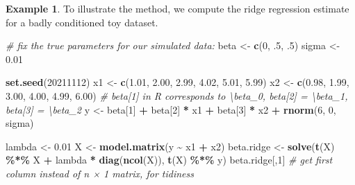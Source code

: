 \documentclass[
  a4paper,
]{article}
\newenvironment{Shaded}{\begin{snugshade}}{\end{snugshade}}
\newcommand{\CommentTok}[1]{\textcolor[rgb]{0.56,0.35,0.01}{\textit{#1}}}
\newcommand{\DecValTok}[1]{\textcolor[rgb]{0.00,0.00,0.81}{#1}}
\newcommand{\FloatTok}[1]{\textcolor[rgb]{0.00,0.00,0.81}{#1}}
\newcommand{\FunctionTok}[1]{\textcolor[rgb]{0.13,0.29,0.53}{\textbf{#1}}}
\newcommand{\NormalTok}[1]{#1}
\newcommand{\OtherTok}[1]{\textcolor[rgb]{0.56,0.35,0.01}{#1}}
\newcommand{\SpecialCharTok}[1]{\textcolor[rgb]{0.81,0.36,0.00}{\textbf{#1}}}
\theoremstyle{definition}
\theoremstyle{definition}
\newtheorem{example}{Example}[section]
\theoremstyle{definition}
\theoremstyle{definition}
\theoremstyle{remark}
\begin{document}
\begin{example}
\protect\hypertarget{exm:knorkel}{}\label{exm:knorkel}To illustrate the method, we compute the ridge regression estimate for
a badly conditioned toy dataset.

\begin{Shaded}
\begin{Highlighting}[]
\CommentTok{\# fix the true parameters for our simulated data:}
\NormalTok{beta }\OtherTok{\textless{}{-}} \FunctionTok{c}\NormalTok{(}\DecValTok{0}\NormalTok{, .}\DecValTok{5}\NormalTok{, .}\DecValTok{5}\NormalTok{)}
\NormalTok{sigma }\OtherTok{\textless{}{-}} \FloatTok{0.01}

\FunctionTok{set.seed}\NormalTok{(}\DecValTok{20211112}\NormalTok{)}
\NormalTok{x1 }\OtherTok{\textless{}{-}} \FunctionTok{c}\NormalTok{(}\FloatTok{1.01}\NormalTok{, }\FloatTok{2.00}\NormalTok{, }\FloatTok{2.99}\NormalTok{, }\FloatTok{4.02}\NormalTok{, }\FloatTok{5.01}\NormalTok{, }\FloatTok{5.99}\NormalTok{)}
\NormalTok{x2 }\OtherTok{\textless{}{-}} \FunctionTok{c}\NormalTok{(}\FloatTok{0.98}\NormalTok{, }\FloatTok{1.99}\NormalTok{, }\FloatTok{3.00}\NormalTok{, }\FloatTok{4.00}\NormalTok{, }\FloatTok{4.99}\NormalTok{, }\FloatTok{6.00}\NormalTok{)}
\CommentTok{\# beta[1] in R corresponds to \textbackslash{}beta\_0, beta[2] = \textbackslash{}beta\_1, beta[3] = \textbackslash{}beta\_2}
\NormalTok{y }\OtherTok{\textless{}{-}}\NormalTok{ beta[}\DecValTok{1}\NormalTok{] }\SpecialCharTok{+}\NormalTok{ beta[}\DecValTok{2}\NormalTok{] }\SpecialCharTok{*}\NormalTok{ x1 }\SpecialCharTok{+}\NormalTok{ beta[}\DecValTok{3}\NormalTok{] }\SpecialCharTok{*}\NormalTok{ x2 }\SpecialCharTok{+} \FunctionTok{rnorm}\NormalTok{(}\DecValTok{6}\NormalTok{, }\DecValTok{0}\NormalTok{, sigma)}

\NormalTok{lambda }\OtherTok{\textless{}{-}} \FloatTok{0.01}
\NormalTok{X }\OtherTok{\textless{}{-}} \FunctionTok{model.matrix}\NormalTok{(y }\SpecialCharTok{\textasciitilde{}}\NormalTok{ x1 }\SpecialCharTok{+}\NormalTok{ x2)}
\NormalTok{beta.ridge }\OtherTok{\textless{}{-}} \FunctionTok{solve}\NormalTok{(}\FunctionTok{t}\NormalTok{(X) }\SpecialCharTok{\%*\%}\NormalTok{ X }\SpecialCharTok{+}\NormalTok{ lambda }\SpecialCharTok{*} \FunctionTok{diag}\NormalTok{(}\FunctionTok{ncol}\NormalTok{(X)), }\FunctionTok{t}\NormalTok{(X) }\SpecialCharTok{\%*\%}\NormalTok{ y)}
\NormalTok{beta.ridge[,}\DecValTok{1}\NormalTok{] }\CommentTok{\# get first column instead of n × 1 matrix, for tidiness}
\end{Highlighting}
\end{Shaded}


\end{example}
\end{document}
